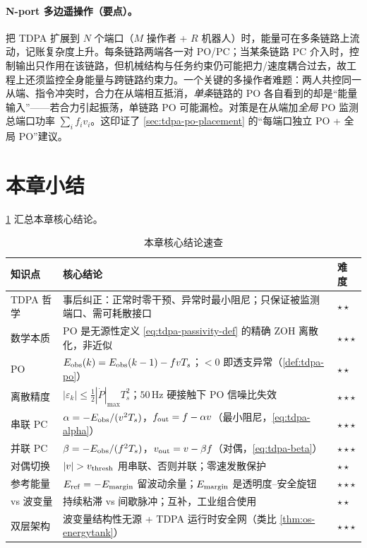 \paragraph{N-port 多边遥操作（要点）。}
把 TDPA 扩展到 $N$ 个端口（$M$ 操作者 + $R$ 机器人）时，能量可在多条链路上流动，记账复杂度上升。每条链路两端各一对 PO/PC；当某条链路 PC 介入时，控制输出只作用在该链路，但机械结构与任务约束仍可能把力/速度耦合过去，故工程上还须监控全身能量与跨链路约束力。一个关键的多操作者难题：两人共控同一从端、指令冲突时，合力在从端相互抵消，\emph{单条}链路的 PO 各自看到的却是“能量输入”——若合力引起振荡，单链路 PO 可能漏检。对策是在从端加\emph{全局} PO 监测总端口功率 $\sum_i f_i v_i$。这印证了 \cref{sec:tdpa-po-placement} 的“每端口独立 PO + 全局 PO”建议。

\section{本章小结}
\label{sec:tdpa-summary}

\cref{tab:tdpa-summary} 汇总本章核心结论。

\begin{table}[H]\centering\small
\caption{本章核心结论速查}
\label{tab:tdpa-summary}
\begin{tabular}{p{} p{} p{}}
\toprule
知识点 & 核心结论 & 难度 \\
\midrule
TDPA 哲学 & 事后纠正：正常时零干预、异常时最小阻尼；只保证被监测端口、需可耗散接口 & $\star\star$ \\
数学本质 & PO 是无源性定义 \cref{eq:tdpa-passivity-def} 的精确 ZOH 离散化，非近似 & $\star\star\star$ \\
PO & $E_{\rm obs}(k)=E_{\rm obs}(k-1)-fvT_s$；$<0$ 即透支异常（\cref{def:tdpa-po}） & $\star\star$ \\
离散精度 & $|\varepsilon_k|\le\tfrac12|\dot P|_{\max}T_s^2$；$50\,\mathrm{Hz}$ 硬接触下 PO 信噪比失效 & $\star\star\star$ \\
串联 PC & $\alpha=-E_{\rm obs}/(v^2T_s)$，$f_{\rm out}=f-\alpha v$（最小阻尼，\cref{eq:tdpa-alpha}） & $\star\star\star$ \\
并联 PC & $\beta=-E_{\rm obs}/(f^2T_s)$，$v_{\rm out}=v-\beta f$（对偶，\cref{eq:tdpa-beta}） & $\star\star\star$ \\
对偶切换 & $|v|>v_{\rm thresh}$ 用串联、否则并联；零速发散保护 & $\star\star$ \\
参考能量 & $E_{\rm ref}=-E_{\rm margin}$ 留波动余量；$E_{\rm margin}$ 是透明度–安全旋钮 & $\star\star\star$ \\
vs 波变量 & 持续粘滞 vs 间歇脉冲；互补，工业组合使用 & $\star\star$ \\
双层架构 & 波变量结构性无源 + TDPA 运行时安全网（类比 \cref{thm:os-energytank}） & $\star\star\star$ \\
\bottomrule
\end{tabular}
\end{table}

